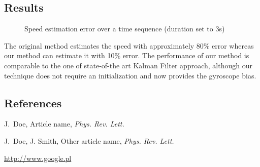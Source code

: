 \documentclass[final]{beamer}
\begin{document}
\begin{frame}[t]
\begin{multicols}{3}
\section{Results}
\begin{figure}[h!]
  \centering
  \caption{Speed estimation error over a time sequence (duration set to 3s)}
  \resizebox{0.5\textwidth}{!}{}
\end{figure}

The original method estimates the speed with approximately 80\% error whereas our method can estimate it with 10\% error.
The performance of our method is comparable to the one of state-of-the art Kalman Filter approach, although our technique
does not require an initialization and now provides the gyroscope bias.





\subsection{References}

\begin{thebibliography}{99}

 J.~Doe, Article name, \textit{Phys. Rev. Lett.}

 J.~Doe, J. Smith, Other article name, \textit{Phys. Rev. Lett.}

 \url{http://www.google.pl}

\end{thebibliography}

\end{multicols}

\end{frame}
\end{document}
